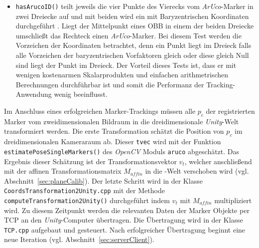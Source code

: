 \begin{itemize}
\item \texttt{hasArucoID()} teilt jeweils die vier Punkte des Vierecks vom \textit{ArUco}-Marker in zwei Dreiecke auf und mit beiden wird ein  mit Baryzentrischen Koordinaten durchgeführt \cite{article:BaryzentriFarin}. Liegt der Mittelpunkt eines OBB in einem der beiden Dreiecke umschließt das Rechteck einen \textit{ArUco}-Marker. Bei diesem Test werden die Vorzeichen der Koordinaten betrachtet, denn ein Punkt liegt im Dreieck falls alle Vorzeichen der baryzentrischen Vorfaktoren gleich oder diese gleich Null sind liegt der Punkt im Dreieck. Der Vorteil dieses Tests ist, dass er mit wenigen kostenarmen Skalarprodukten und einfachen arithmetrischen Berechnungen durchführbar ist und somit die Performanz der Tracking-Anwendung wenig beeinflusst. 
\end{itemize}
Im Anschluss eines erfolgreichen Marker-Trackings müssen alle $p_c$ der registrierten Marker vom zweidimensionalen Bildraum in die dreidimensionale \textit{Unity}-Welt transformiert werden. Die erste Transformation schätzt die Position von $p_c$ im dreidimensionalen Kameraraum ab. Dieser \texttt{tvec} wird mit der Funktion \texttt{estimate\-Pose\-Single\-Markers()} des \textit{OpenCV} Moduls \texttt{aruco} abgeschätzt.
Das Ergebnis dieser Schätzung ist der Transformationsvektor $v_t$, welcher anschließend mit der affinen Transformationsmatrix $M_{affin}$ in die -Welt verschoben wird (vgl. Abschnitt~\ref{sec:planeCalib}). Der letzte Schritt wird in der Klasse \texttt{Coords\-Trans\-formation\-2Unity.cpp} mit der Methode \texttt{compute\-Transformation\-2Unity()} durchgeführt indem $v_t$ mit $M_{affin}$ multipliziert wird. Zu diesem Zeitpunkt werden die relevanten Daten der Marker Objekte per TCP an den \textit{Unity}-Computer übertragen. Die Übertragung wird in der Klasse \texttt{TCP.cpp} aufgebaut und gesteuert. Nach erfolgreicher Übertragung beginnt eine neue Iteration (vgl. Abschnitt~\ref{sec:serverClient}).

\newpage